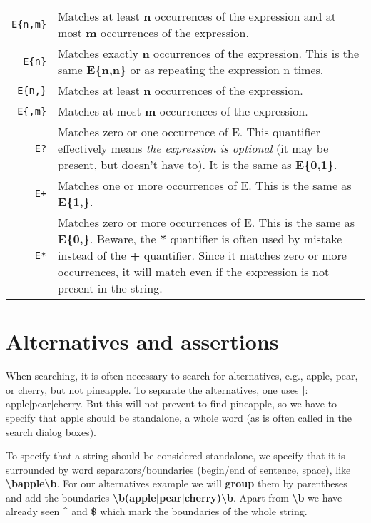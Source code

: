 \noindent\begin{tabular}{Rp{113mm}}
\toprule
\verb|E{n,m}| & Matches at least \textbf{n} occurrences of the expression and at most \textbf{m} occurrences of the expression.\\
\verb|E{n}| & Matches exactly \textbf{n} occurrences of the expression. This is the same \textbf{E\{n,n\}} or as repeating the expression n times.\\
\verb|E{n,}| & Matches at least \textbf{n} occurrences of the expression.\\
\verb|E{,m}| & Matches at most \textbf{m} occurrences of the expression.\\
\verb|E?| & Matches zero or one occurrence of E. This quantifier effectively means \emph{the expression is optional} (it may be present, but doesn't have to). It is the same as \textbf{E\{0,1\}}.\\
\verb|E+| & Matches one or more occurrences of E. This is the same as \textbf{E\{1,\}}.\\
\verb|E*| & Matches zero or more occurrences of E. This is the same as \textbf{E\{0,\}}. Beware, the \textbf{*} quantifier is often used by mistake instead of the \textbf{+} quantifier. Since it matches zero or more occurrences, it will match even if the expression is not present in the string.\\
\bottomrule
\end{tabular}
\smallskip

\section{Alternatives and assertions}

When searching, it is often necessary to search for alternatives, e.g., apple, pear, or cherry, but not pineapple. To separate the alternatives, one uses \textbf{|}: apple|pear|cherry. But this will not prevent to find pineapple, so we have to specify that apple should be standalone, a whole word (as is often called in the search dialog boxes).

To specify that a string should be considered standalone, we specify that it is surrounded by word separators/boundaries (begin/end of sentence, space), like \textbf{\textbackslash{}bapple\textbackslash{}b}. For our alternatives example we will \textbf{group} them by parentheses and add the boundaries \textbf{\textbackslash{}b(apple|pear|cherry)\textbackslash{}b}. Apart from \textbf{\textbackslash{}b} we have already seen \textbf{\^{}} and \textbf{\$} which mark the boundaries of the whole string.

